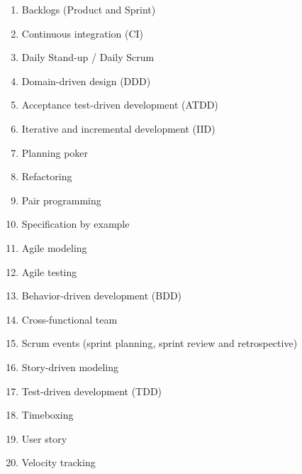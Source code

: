     \begin{enumerate}
        \item Backlogs (Product and Sprint)
        \item Continuous integration (CI)
        \item Daily Stand-up / Daily Scrum
        \item Domain-driven design (DDD)
        \item Acceptance test-driven development (ATDD)
        \item Iterative and incremental development (IID)
        \item Planning poker
        \item Refactoring
        \item Pair programming
        \item Specification by example
        \item Agile modeling
        \item Agile testing
        \item Behavior-driven development (BDD)
        \item Cross-functional team
        \item Scrum events (sprint planning, sprint review and retrospective)
        \item Story-driven modeling
        \item Test-driven development (TDD)
        \item Timeboxing
        \item User story
        \item Velocity tracking
    \end{enumerate}

